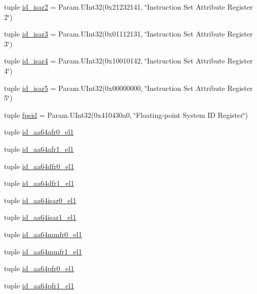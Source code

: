 \begin{DoxyCompactItemize}
\item 
tuple \hyperlink{classArmISA_1_1ArmISA_ae11a7345ff321d9862ad5d191c1b0c00}{id\_\-isar2} = Param.UInt32(0x21232141, \char`\"{}Instruction Set Attribute Register 2\char`\"{})
\item 
tuple \hyperlink{classArmISA_1_1ArmISA_a1c4b03d3168741e37bc59081afabfb0a}{id\_\-isar3} = Param.UInt32(0x01112131, \char`\"{}Instruction Set Attribute Register 3\char`\"{})
\item 
tuple \hyperlink{classArmISA_1_1ArmISA_af5e1d9cbcd845b027407c0fabeb71203}{id\_\-isar4} = Param.UInt32(0x10010142, \char`\"{}Instruction Set Attribute Register 4\char`\"{})
\item 
tuple \hyperlink{classArmISA_1_1ArmISA_a0d892492ba35f791899a6163154520b7}{id\_\-isar5} = Param.UInt32(0x00000000, \char`\"{}Instruction Set Attribute Register 5\char`\"{})
\item 
tuple \hyperlink{classArmISA_1_1ArmISA_a343b37c88080e59b99f27bbba4952cbd}{fpsid} = Param.UInt32(0x410430a0, \char`\"{}Floating-\/point System ID Register\char`\"{})
\item 
tuple \hyperlink{classArmISA_1_1ArmISA_a8a05160e092e263032d299855aff693a}{id\_\-aa64afr0\_\-el1}
\item 
tuple \hyperlink{classArmISA_1_1ArmISA_aad93eed9a0c27e7c2eee4d3466dc70d9}{id\_\-aa64afr1\_\-el1}
\item 
tuple \hyperlink{classArmISA_1_1ArmISA_a2acdc720c9a09cc3d721207930c48216}{id\_\-aa64dfr0\_\-el1}
\item 
tuple \hyperlink{classArmISA_1_1ArmISA_a4e541a138caa99addfa97b61770450ab}{id\_\-aa64dfr1\_\-el1}
\item 
tuple \hyperlink{classArmISA_1_1ArmISA_a4d97d046da9986f95c22a914629decdd}{id\_\-aa64isar0\_\-el1}
\item 
tuple \hyperlink{classArmISA_1_1ArmISA_af6b7dfad4c11bc8baa25694d43bfd3e5}{id\_\-aa64isar1\_\-el1}
\item 
tuple \hyperlink{classArmISA_1_1ArmISA_a9b9694e4a3282d096698500d588e8bbf}{id\_\-aa64mmfr0\_\-el1}
\item 
tuple \hyperlink{classArmISA_1_1ArmISA_a9d4cea762de219858576fe1aead51b89}{id\_\-aa64mmfr1\_\-el1}
\item 
tuple \hyperlink{classArmISA_1_1ArmISA_a97479937aaafcc7638ff69bdb8ef3bf5}{id\_\-aa64pfr0\_\-el1}
\item 
tuple \hyperlink{classArmISA_1_1ArmISA_ac5dbfd243326cded368de7fd0651226d}{id\_\-aa64pfr1\_\-el1}
\end{DoxyCompactItemize}


